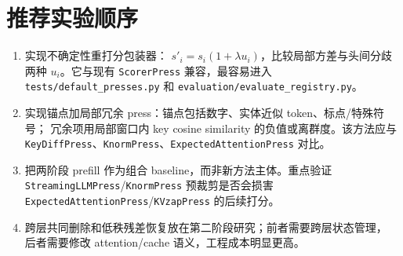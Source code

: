 \documentclass[UTF8]{ctexart}
\begin{document}
\section*{推荐实验顺序}

\begin{enumerate}[leftmargin=1.5em]
  \item 实现不确定性重打分包装器：
  \(s'_i=s_i(1+\lambda u_i)\)，比较局部方差与头间分歧两种
  \(u_i\)。它与现有 \texttt{ScorerPress} 兼容，最容易进入
  \texttt{tests/default\_presses.py} 和 \texttt{evaluation/evaluate\_registry.py}。
  \item 实现锚点加局部冗余 press：锚点包括数字、实体近似 token、标点/特殊符号；
  冗余项用局部窗口内 key cosine similarity 的负值或离群度。该方法应与
  \texttt{KeyDiffPress}、\texttt{KnormPress}、\texttt{ExpectedAttentionPress}
  对比。
  \item 把两阶段 prefill 作为组合 baseline，而非新方法主体。重点验证
  \texttt{StreamingLLMPress}/\texttt{KnormPress} 预裁剪是否会损害
  \texttt{ExpectedAttentionPress}/\texttt{KVzapPress} 的后续打分。
  \item 跨层共同删除和低秩残差恢复放在第二阶段研究；前者需要跨层状态管理，
  后者需要修改 attention/cache 语义，工程成本明显更高。
\end{enumerate}
\end{document}

